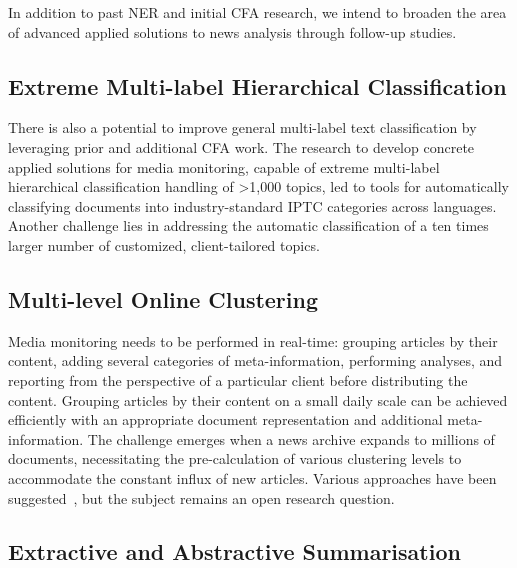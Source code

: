 In addition to past NER and initial CFA research, we intend to broaden the area of advanced applied solutions to news analysis through follow-up studies.

\subsection{Extreme Multi-label Hierarchical Classification}

There is also a potential to improve general multi-label text classification by leveraging prior and additional CFA work. 
The research to develop concrete applied solutions for media monitoring, capable of extreme multi-label hierarchical classification handling of >1,000 topics, led to tools for automatically classifying documents into industry-standard IPTC categories across languages.
Another challenge lies in addressing the automatic classification of a ten times larger number of customized, client-tailored topics.

\subsection{Multi-level Online Clustering}

Media monitoring needs to be performed in real-time: grouping articles by their content, adding several categories of meta-information, performing analyses, and reporting from the perspective of a particular client before distributing the content.
Grouping articles by their content on a small daily scale can be achieved efficiently with an appropriate document representation and additional meta-information.
The challenge emerges when a news archive expands to millions of documents, necessitating the pre-calculation of various clustering levels to accommodate the constant influx of new articles.
Various approaches have been suggested~\parencite{Miranda2018MultilingualCO, jiang2021topic, Santos2022SimplifyingMN}, but the subject remains an open research question.

\subsection{Extractive and Abstractive Summarisation}

